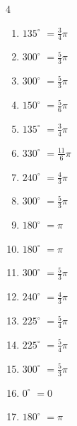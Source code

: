 \begin{multicols}{4}
\begin{enumerate}
  \item $\displaystyle 135^{\circ}$
        $\displaystyle =\frac{3}{4}\pi$

  \item $\displaystyle 300^{\circ}$
        $\displaystyle =\frac{5}{3}\pi$

  \item $\displaystyle 300^{\circ}$
        $\displaystyle =\frac{5}{3}\pi$

  \item $\displaystyle 150^{\circ}$
        $\displaystyle =\frac{5}{6}\pi$

  \item $\displaystyle 135^{\circ}$
        $\displaystyle =\frac{3}{4}\pi$

  \item $\displaystyle 330^{\circ}$
        $\displaystyle =\frac{11}{6}\pi$

\columnbreak %

\resetques

  \item $\displaystyle 240^{\circ}$
        $\displaystyle =\frac{4}{3}\pi$

  \item $\displaystyle 300^{\circ}$
        $\displaystyle =\frac{5}{3}\pi$

  \item $\displaystyle 180^{\circ}$
        $\displaystyle =\pi$

  \item $\displaystyle 180^{\circ}$
        $\displaystyle =\pi$

  \item $\displaystyle 300^{\circ}$
        $\displaystyle =\frac{5}{3}\pi$

  \item $\displaystyle 240^{\circ}$
        $\displaystyle =\frac{4}{3}\pi$

  \item $\displaystyle 225^{\circ}$
        $\displaystyle =\frac{5}{4}\pi$

  \item $\displaystyle 225^{\circ}$
        $\displaystyle =\frac{5}{4}\pi$

  \item $\displaystyle 300^{\circ}$
        $\displaystyle =\frac{5}{3}\pi$

  \item $\displaystyle 0^{\circ}$
        $\displaystyle =0$

  \item $\displaystyle 180^{\circ}$
        $\displaystyle =\pi$


\end{enumerate}
\end{multicols}
